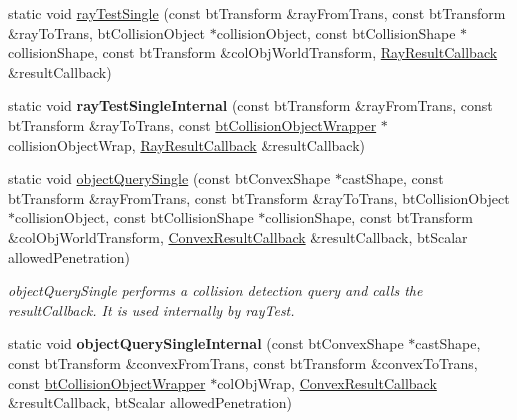 \begin{DoxyCompactItemize}
\item 
static void \hyperlink{classbtCollisionWorld_a2c4ba56a014d2a7d97d9da557f359f36}{ray\+Test\+Single} (const bt\+Transform \&ray\+From\+Trans, const bt\+Transform \&ray\+To\+Trans, bt\+Collision\+Object $\ast$collision\+Object, const bt\+Collision\+Shape $\ast$collision\+Shape, const bt\+Transform \&col\+Obj\+World\+Transform, \hyperlink{structbtCollisionWorld_1_1RayResultCallback}{Ray\+Result\+Callback} \&result\+Callback)
\item 
\mbox{\label{classbtCollisionWorld_aeecfeba65c80ce801cc2046cccd08eab}} 
static void {\bfseries ray\+Test\+Single\+Internal} (const bt\+Transform \&ray\+From\+Trans, const bt\+Transform \&ray\+To\+Trans, const \hyperlink{structbtCollisionObjectWrapper}{bt\+Collision\+Object\+Wrapper} $\ast$collision\+Object\+Wrap, \hyperlink{structbtCollisionWorld_1_1RayResultCallback}{Ray\+Result\+Callback} \&result\+Callback)
\item 
\mbox{\label{classbtCollisionWorld_a7d31ae445178cb57788c9781dbb1e94f}} 
static void \hyperlink{classbtCollisionWorld_a7d31ae445178cb57788c9781dbb1e94f}{object\+Query\+Single} (const bt\+Convex\+Shape $\ast$cast\+Shape, const bt\+Transform \&ray\+From\+Trans, const bt\+Transform \&ray\+To\+Trans, bt\+Collision\+Object $\ast$collision\+Object, const bt\+Collision\+Shape $\ast$collision\+Shape, const bt\+Transform \&col\+Obj\+World\+Transform, \hyperlink{structbtCollisionWorld_1_1ConvexResultCallback}{Convex\+Result\+Callback} \&result\+Callback, bt\+Scalar allowed\+Penetration)
\begin{DoxyCompactList}\small\item\em object\+Query\+Single performs a collision detection query and calls the result\+Callback. It is used internally by ray\+Test. \end{DoxyCompactList}\item 
\mbox{\label{classbtCollisionWorld_ad257a679265cf11c3651a5780c81c133}} 
static void {\bfseries object\+Query\+Single\+Internal} (const bt\+Convex\+Shape $\ast$cast\+Shape, const bt\+Transform \&convex\+From\+Trans, const bt\+Transform \&convex\+To\+Trans, const \hyperlink{structbtCollisionObjectWrapper}{bt\+Collision\+Object\+Wrapper} $\ast$col\+Obj\+Wrap, \hyperlink{structbtCollisionWorld_1_1ConvexResultCallback}{Convex\+Result\+Callback} \&result\+Callback, bt\+Scalar allowed\+Penetration)
\end{DoxyCompactItemize}
